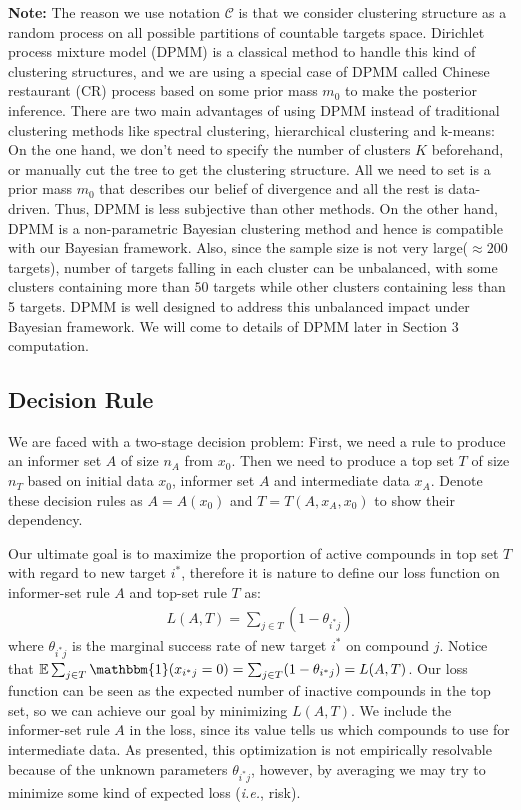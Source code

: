\documentclass[12pt]{article}
\begin{document}
\textbf{Note:} The reason we use notation $\mathcal{C}$ is that we consider clustering structure as a random process on all possible partitions of countable targets space. Dirichlet process mixture model (DPMM) is a classical method to handle this kind of clustering structures, and we are using a special case of DPMM called Chinese restaurant (CR) process based on some prior mass
$m_0$ to make the posterior inference. There are two main advantages of using DPMM instead of traditional clustering methods like spectral clustering, hierarchical clustering and k-means: On the one hand, we don't need to specify the number of clusters $K$ beforehand, or manually cut the tree to get the clustering structure. All we need to set is a prior mass $m_0$ that describes our belief of divergence and all the rest is data-driven. Thus, DPMM is less subjective than other methods. On the other hand, DPMM is a non-parametric Bayesian clustering method and hence is compatible with our Bayesian framework. Also, since the sample size is not very large($\approx 200$ targets), number of targets falling in each cluster can be unbalanced, with some clusters containing more than $50$ targets while other clusters containing less than 5 targets. DPMM is well designed to address this unbalanced impact under Bayesian framework. We will come to details of DPMM later in Section $3$ computation. 



\subsection{Decision Rule}

We are faced with a two-stage decision problem: First, we need a rule to produce an informer set $A$ of size $n_A$ from $x_0$. Then we need to produce a top set $T$ of size $n_T$ based on initial data $x_0$, informer set $A$ and intermediate data $x_A$. Denote these decision rules as $A = A(x_0)$ and $T = T(A,x_A,x_0)$ to show their dependency. 

Our ultimate goal is to maximize the proportion of active compounds in top set $T$ with regard to new target $i^*$, therefore it is nature to define our loss function on informer-set rule $A$ and top-set rule $T$ as:
\begin{eqnarray}
\label{eq:loss}
L(A, T) = \sum_{j \in T} \left( 1- \theta_{i^*j} \right)
\end{eqnarray}
where $\theta_{i^*j}$ is the marginal success rate of new target $i^*$ on compound $j$. Notice that $\mathbb E\sum_{j\in T}\mathbbm{1}(x_{i^*j}=0) = \sum_{j \in T} ( 1- \theta_{i^*j} ) = L(A,T)$. Our loss function can be seen as the expected number of inactive compounds in the top set, so  we can achieve our goal by minimizing $L(A, T)$.  We include the informer-set rule $A$ in the loss, since
its value tells us which compounds to use for intermediate data.  As presented,
this optimization is not
empirically resolvable because of the unknown parameters $\theta_{i^*j}$, however, by averaging we may try to minimize some kind
of expected loss ({\em i.e.}, risk).
\end{document}
